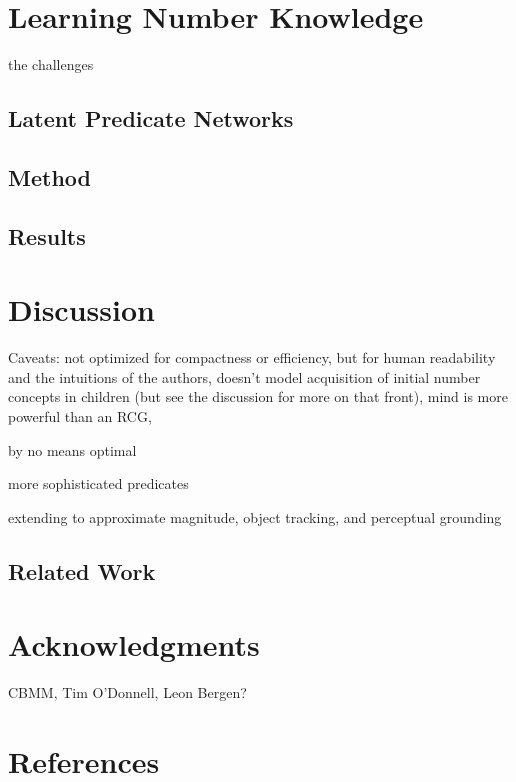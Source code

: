\documentclass[10pt,letterpaper]{article}
\begin{document}
\section{Learning Number Knowledge}

the challenges

\subsection{Latent Predicate Networks}

\subsection{Method}

\subsection{Results}

\section{Discussion}

Caveats: not optimized for compactness or efficiency, but for human
readability and the intuitions of the authors, doesn't model
acquisition of initial number concepts in children (but see the
discussion for more on that front), mind is more powerful than an RCG,

by no means optimal

more sophisticated predicates

extending to approximate magnitude, object tracking, and perceptual grounding

\subsection{Related Work}

\section{Acknowledgments}

CBMM, Tim O'Donnell, Leon Bergen?

\section{References}



\setlength{\bibleftmargin}{.125in}
\setlength{\bibindent}{-\bibleftmargin}
% 
\end{document}
